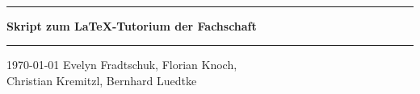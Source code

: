\begin{center}
	\fslogo \\
	\vspace{3em}
	\rule{\textwidth}{1pt}\par
	\vspace{0.8\baselineskip}
			\Huge\bfseries Skript zum \LaTeX-Tutorium der Fachschaft 
	\vspace{0.8\baselineskip}
	\rule{\textwidth}{1pt}\par
	{\large \today}
	\vfill
	{\Large{ Evelyn Fradtschuk, Florian Knoch,\\
	Christian Kremitzl, Bernhard Luedtke}}\\		
	\vfill
\end{center}

